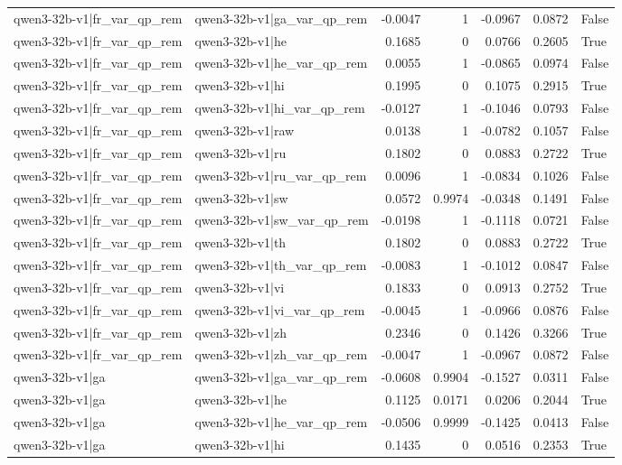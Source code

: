 \begin{table}
\begin{tabular}{l l r r r r l}
qwen3-32b-v1|fr_var_qp_rem & qwen3-32b-v1|ga_var_qp_rem & -0.0047 & 1 & -0.0967 & 0.0872 & False \\
qwen3-32b-v1|fr_var_qp_rem & qwen3-32b-v1|he & 0.1685 & 0 & 0.0766 & 0.2605 & True \\
qwen3-32b-v1|fr_var_qp_rem & qwen3-32b-v1|he_var_qp_rem & 0.0055 & 1 & -0.0865 & 0.0974 & False \\
qwen3-32b-v1|fr_var_qp_rem & qwen3-32b-v1|hi & 0.1995 & 0 & 0.1075 & 0.2915 & True \\
qwen3-32b-v1|fr_var_qp_rem & qwen3-32b-v1|hi_var_qp_rem & -0.0127 & 1 & -0.1046 & 0.0793 & False \\
qwen3-32b-v1|fr_var_qp_rem & qwen3-32b-v1|raw & 0.0138 & 1 & -0.0782 & 0.1057 & False \\
qwen3-32b-v1|fr_var_qp_rem & qwen3-32b-v1|ru & 0.1802 & 0 & 0.0883 & 0.2722 & True \\
qwen3-32b-v1|fr_var_qp_rem & qwen3-32b-v1|ru_var_qp_rem & 0.0096 & 1 & -0.0834 & 0.1026 & False \\
qwen3-32b-v1|fr_var_qp_rem & qwen3-32b-v1|sw & 0.0572 & 0.9974 & -0.0348 & 0.1491 & False \\
qwen3-32b-v1|fr_var_qp_rem & qwen3-32b-v1|sw_var_qp_rem & -0.0198 & 1 & -0.1118 & 0.0721 & False \\
qwen3-32b-v1|fr_var_qp_rem & qwen3-32b-v1|th & 0.1802 & 0 & 0.0883 & 0.2722 & True \\
qwen3-32b-v1|fr_var_qp_rem & qwen3-32b-v1|th_var_qp_rem & -0.0083 & 1 & -0.1012 & 0.0847 & False \\
qwen3-32b-v1|fr_var_qp_rem & qwen3-32b-v1|vi & 0.1833 & 0 & 0.0913 & 0.2752 & True \\
qwen3-32b-v1|fr_var_qp_rem & qwen3-32b-v1|vi_var_qp_rem & -0.0045 & 1 & -0.0966 & 0.0876 & False \\
qwen3-32b-v1|fr_var_qp_rem & qwen3-32b-v1|zh & 0.2346 & 0 & 0.1426 & 0.3266 & True \\
qwen3-32b-v1|fr_var_qp_rem & qwen3-32b-v1|zh_var_qp_rem & -0.0047 & 1 & -0.0967 & 0.0872 & False \\
qwen3-32b-v1|ga & qwen3-32b-v1|ga_var_qp_rem & -0.0608 & 0.9904 & -0.1527 & 0.0311 & False \\
qwen3-32b-v1|ga & qwen3-32b-v1|he & 0.1125 & 0.0171 & 0.0206 & 0.2044 & True \\
qwen3-32b-v1|ga & qwen3-32b-v1|he_var_qp_rem & -0.0506 & 0.9999 & -0.1425 & 0.0413 & False \\
qwen3-32b-v1|ga & qwen3-32b-v1|hi & 0.1435 & 0 & 0.0516 & 0.2353 & True \\

\end{tabular}
\end{table}
